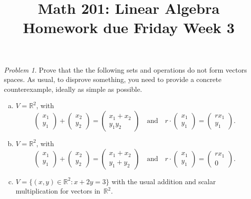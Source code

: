 \documentclass[11pt,twoside]{amsart}
\title{Math 201: Linear Algebra\\ Homework due Friday Week 3}
\theoremstyle{plain}
\theoremstyle{remark}
\newtheorem{prob}{Problem}
\theoremstyle{definition}
\theoremstyle{definition}
\newcommand{\RR}{\mathbb{R}}
\begin{document}
\maketitle


\begin{prob}
Prove that the the following sets and operations do not form vectors spaces.  As usual, to disprove something, you need to provide a concrete counterexample, ideally as simple as possible.   
\begin{enumerate}[(a)]
\item $V=\RR^2$, with 
\[\begin{pmatrix}
x_1\\
y_1
\end{pmatrix}
+
\begin{pmatrix}
x_2\\
y_2
\end{pmatrix}
=
\begin{pmatrix}
x_1+x_2\\
y_1y_2
\end{pmatrix}\quad \mbox{and} \quad
r\cdot\begin{pmatrix}
x_1\\
y_1
\end{pmatrix}
=
\begin{pmatrix}
rx_1\\
y_1
\end{pmatrix}.
\]
\item $V=\RR^2$, with 
\[\begin{pmatrix}
x_1\\
y_1
\end{pmatrix}
+
\begin{pmatrix}
x_2\\
y_2
\end{pmatrix}
=
\begin{pmatrix}
x_1+x_2\\
y_1+y_2
\end{pmatrix}\quad \mbox{and} \quad
r\cdot\begin{pmatrix}
x_1\\
y_1
\end{pmatrix}
=
\begin{pmatrix}
rx_1\\
0
\end{pmatrix}.
\]
\item $V = \{(x,y)\in\RR^2:x+2y=3\}$ with the usual addition and scalar multiplication for vectors in~$\RR^2$.
\end{enumerate}
\end{prob}
\end{document}

